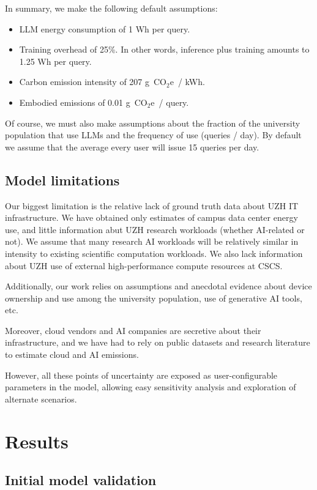 \documentclass[11pt]{article}
\newcommand{\coe}{CO$_2$e}
\newcommand{\gcoe}{g~\coe}
\newcommand{\gcoekwh}{\gcoe\ / kWh}
\begin{document}
In summary, we make the following default assumptions:

\begin{itemize}
  \item LLM energy consumption of 1 Wh per query.
  \item Training overhead of 25\%. In other words, inference plus training amounts to 1.25 Wh per query.
  \item Carbon emission intensity of 207 \gcoekwh.
  \item Embodied emissions of 0.01 \gcoe\ / query.
\end{itemize}

Of course, we must also make assumptions about the fraction of the university population that use LLMs and the frequency of use (queries / day). By default we assume that the average every user will issue 15 queries per day.

\subsection{Model limitations}

Our biggest limitation is the relative lack of ground truth data about UZH IT infrastructure. We have obtained only estimates of campus data center energy use, and little information abut UZH research workloads (whether AI-related or not). We assume that many research AI workloads will be relatively similar in intensity to existing scientific computation workloads. We also lack information about UZH use of external high-performance compute resources at CSCS.

Additionally, our work relies on assumptions and anecdotal evidence about device ownership and use among the university population, use of generative AI tools, etc.

Moreover, cloud vendors and AI companies are secretive about their infrastructure, and we have had to rely on public datasets and research literature to estimate cloud and AI emissions.

However, all these points of uncertainty are exposed as user-configurable parameters in the model, allowing easy sensitivity analysis and exploration of alternate scenarios.

\section{Results}
\label{sec:results}

\subsection{Initial model validation}
\end{document}
